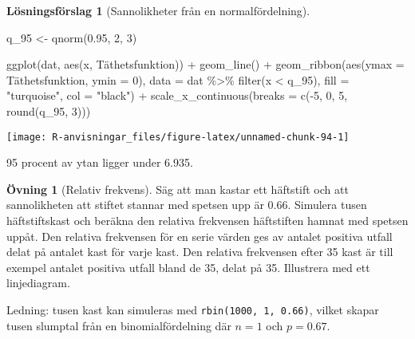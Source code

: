 \documentclass[
]{book}
\newenvironment{Shaded}{\begin{snugshade}}{\end{snugshade}}
\newcommand{\AttributeTok}[1]{\textcolor[rgb]{0.77,0.63,0.00}{#1}}
\newcommand{\DecValTok}[1]{\textcolor[rgb]{0.00,0.00,0.81}{#1}}
\newcommand{\FloatTok}[1]{\textcolor[rgb]{0.00,0.00,0.81}{#1}}
\newcommand{\FunctionTok}[1]{\textcolor[rgb]{0.00,0.00,0.00}{#1}}
\newcommand{\NormalTok}[1]{#1}
\newcommand{\OtherTok}[1]{\textcolor[rgb]{0.56,0.35,0.01}{#1}}
\newcommand{\SpecialCharTok}[1]{\textcolor[rgb]{0.00,0.00,0.00}{#1}}
\newcommand{\StringTok}[1]{\textcolor[rgb]{0.31,0.60,0.02}{#1}}
\theoremstyle{definition}
\theoremstyle{definition}
\theoremstyle{definition}
\newtheorem{exercise}{Övning}[chapter]
\theoremstyle{definition}
\newtheorem{hypothesis}{Lösningsförslag}[chapter]
\theoremstyle{remark}
\begin{document}
\begin{hypothesis}[Sannolikheter från en normalfördelning]
\begin{Shaded}
\begin{Highlighting}[]
\NormalTok{q\_95 }\OtherTok{\textless{}{-}} \FunctionTok{qnorm}\NormalTok{(}\FloatTok{0.95}\NormalTok{, }\DecValTok{2}\NormalTok{, }\DecValTok{3}\NormalTok{)}

\FunctionTok{ggplot}\NormalTok{(dat, }\FunctionTok{aes}\NormalTok{(x, Täthetsfunktion)) }\SpecialCharTok{+}
  \FunctionTok{geom\_line}\NormalTok{() }\SpecialCharTok{+}
  \FunctionTok{geom\_ribbon}\NormalTok{(}\FunctionTok{aes}\NormalTok{(}\AttributeTok{ymax =}\NormalTok{ Täthetsfunktion, }\AttributeTok{ymin =} \DecValTok{0}\NormalTok{), }
              \AttributeTok{data =}\NormalTok{ dat }\SpecialCharTok{\%\textgreater{}\%} \FunctionTok{filter}\NormalTok{(x }\SpecialCharTok{\textless{}}\NormalTok{ q\_95),}
              \AttributeTok{fill =} \StringTok{"turquoise"}\NormalTok{, }\AttributeTok{col =} \StringTok{"black"}\NormalTok{) }\SpecialCharTok{+}
  \FunctionTok{scale\_x\_continuous}\NormalTok{(}\AttributeTok{breaks =} \FunctionTok{c}\NormalTok{(}\SpecialCharTok{{-}}\DecValTok{5}\NormalTok{, }\DecValTok{0}\NormalTok{, }\DecValTok{5}\NormalTok{, }\FunctionTok{round}\NormalTok{(q\_95, }\DecValTok{3}\NormalTok{)))}
\end{Highlighting}
\end{Shaded}

\begin{center}\texttt{[image: R-anvisningar\_files/figure-latex/unnamed-chunk-94-1]} \end{center}

95 procent av ytan ligger under 6.935.
\end{hypothesis}

\begin{exercise}[Relativ frekvens]
Säg att man kastar ett häftstift och att sannolikheten att stiftet stannar med spetsen upp är 0.66. Simulera tusen häftstiftskast och beräkna den relativa frekvensen häftstiften hamnat med spetsen uppåt. Den relativa frekvensen för en serie värden ges av antalet positiva utfall delat på antalet kast för varje kast. Den relativa frekvensen efter 35 kast är till exempel antalet positiva utfall bland de 35, delat på 35.
Illustrera med ett linjediagram.

Ledning: tusen kast kan simuleras med \texttt{rbin(1000,\ 1,\ 0.66)}, vilket skapar tusen slumptal från en binomialfördelning där \(n = 1\) och \(p = 0.67\).
\end{exercise}
\end{document}
